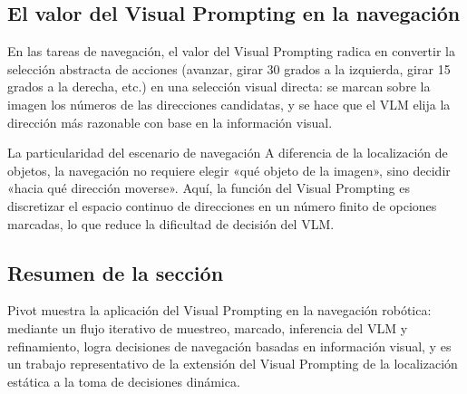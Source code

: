 \subsection{El valor del Visual Prompting en la navegación}

En las tareas de navegación, el valor del Visual Prompting radica en convertir la selección abstracta de acciones (avanzar, girar 30 grados a la izquierda, girar 15 grados a la derecha, etc.) en una selección visual directa: se marcan sobre la imagen los números de las direcciones candidatas, y se hace que el VLM elija la dirección más razonable con base en la información visual.

\begin{warningbox}{La particularidad del escenario de navegación}
A diferencia de la localización de objetos, la navegación no requiere elegir «qué objeto de la imagen», sino decidir «hacia qué dirección moverse». Aquí, la función del Visual Prompting es discretizar el espacio continuo de direcciones en un número finito de opciones marcadas, lo que reduce la dificultad de decisión del VLM.
\end{warningbox}

\subsection{Resumen de la sección}

Pivot muestra la aplicación del Visual Prompting en la navegación robótica: mediante un flujo iterativo de muestreo, marcado, inferencia del VLM y refinamiento, logra decisiones de navegación basadas en información visual, y es un trabajo representativo de la extensión del Visual Prompting de la localización estática a la toma de decisiones dinámica.

